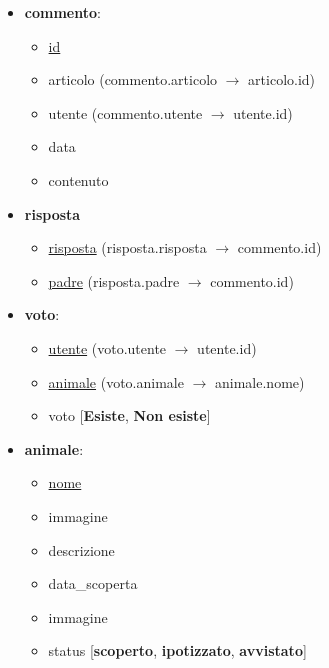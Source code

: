 \begin{itemize}
        \item \textbf{commento}:
        \begin{itemize}
            \item \underline{id}
            \item articolo (commento.articolo $\rightarrow$ articolo.id)
            \item utente (commento.utente $\rightarrow$ utente.id)
            \item data
            \item contenuto
        \end{itemize}

        \item \textbf{risposta}
        \begin{itemize}
            \item \underline{risposta} (risposta.risposta $\rightarrow$ commento.id)
            \item \underline{padre} (risposta.padre $\rightarrow$ commento.id)
        \end{itemize}

        \item \textbf{voto}:
        \begin{itemize}
            \item \underline{utente} (voto.utente $\rightarrow$ utente.id)
            \item \underline{animale} (voto.animale $\rightarrow$ animale.nome)
            \item voto [\textbf{Esiste}, \textbf{Non esiste}]
        \end{itemize}

        \item \textbf{animale}:
        \begin{itemize}
            \item \underline{nome} 
            \item immagine
            \item descrizione
            \item data\_scoperta
            \item immagine
            \item status [\textbf{scoperto}, \textbf{ipotizzato}, \textbf{avvistato}]
        \end{itemize}
    \end{itemize}